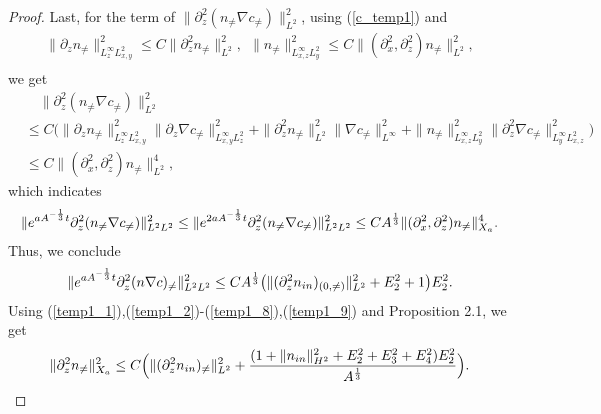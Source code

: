 \documentclass[12pt, reqno]{amsart}
\numberwithin{equation}{section}
\begin{document}
\begin{proof}
		Last, for the term of $
		\|\partial_z^2(n_{\neq}\nabla c_{\neq})\|^2_{L^2}$,  using (\ref{c_temp1}) and 
		\begin{equation*}
			\begin{aligned}
				\|\partial_zn_{\neq}\|^2_{L^{\infty}_{z}L^2_{x,y}}\leq 
				C\|\partial_z^2n_{\neq}\|^2_{L^2},~~
				\|n_{\neq}\|^2_{L^{\infty}_{x,z}L^2_{y}}\leq 
				C\|(\partial_x^2,\partial_z^2)n_{\neq}\|^2_{L^{2}},\\
			\end{aligned}
		\end{equation*}		
		we get 
		\begin{equation*}
			\begin{aligned}
				&\quad\|\partial_z^2(n_{\neq}\nabla c_{\neq})\|^2_{L^2}\\
				&\leq C\big(\|\partial_zn_{\neq}\|^2_{L^{\infty}_{z}L^2_{x,y}}
				\|\partial_z\nabla c_{\neq}\|^2_{L^{\infty}_{x,y}L^2_{z}}
				+\|\partial_z^2n_{\neq}\|^2_{L^2}
				\|\nabla c_{\neq}\|^2_{L^{\infty}}
				+\|n_{\neq}\|^2_{L^{\infty}_{x,z}L^2_{y}}
				\|\partial_z^2\nabla c_{\neq}\|^2_{L^{\infty}_{y}L^2_{x,z}}
				\big)\\
				&\leq C
				\|(\partial_x^2,\partial_z^2)n_{\neq}\|^4_{L^{2}},
			\end{aligned}
		\end{equation*}
		which indicates 
		\begin{equation}\label{nc_neq1}
			\begin{aligned}
				\|{\rm e}^{aA^{-\frac{1}{3}}t}
				\partial_z^2(n_{\neq}\nabla c_{\neq})\|^2_{L^2L^2}\leq 
				\|{\rm e}^{2aA^{-\frac{1}{3}}t}
				\partial_z^2(n_{\neq}\nabla c_{\neq})\|^2_{L^2L^2}
				\leq CA^{\frac13}
				\|(\partial_x^2,\partial_z^2)n_{\neq}\|^4_{X_a}.
			\end{aligned}
		\end{equation}
		Thus, we conclude  
		\begin{equation}\label{temp1_9}
			\begin{aligned}
				\|{\rm e}^{aA^{-\frac{1}{3}}t}
				\partial_z^2(n\nabla c)_{\neq}\|^2_{L^2L^2}\leq 
				CA^{\frac13}\big(\|(\partial_z^2n_{\rm in})_{(0,\neq)}\|^2_{L^2}
				+E_2^2+1\big)E_2^2.
			\end{aligned}
		\end{equation}
		Using (\ref{temp1_1}),(\ref{temp1_2})-(\ref{temp1_8}),(\ref{temp1_9}) and Proposition 2.1,
		we  get 
		\begin{equation}\label{n_zz_result}
			\begin{aligned}
				\|\partial_z^2n_{\neq}\|^2_{X_a}\leq 
				C\Big(\|(\partial_z^2n_{\rm in})_{\neq}\|^2_{L^2}+\frac{(1
					+\|n_{\rm in}\|_{H^2}^2
					+E_2^2+E_3^2+E_4^2)E_2^2}{A^{\frac13}}\Big).
			\end{aligned}
		\end{equation}
		

\end{proof}
\end{document}
